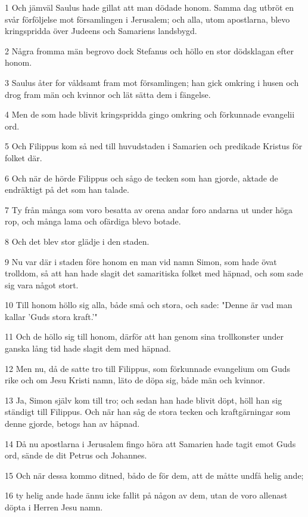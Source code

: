\par 1 Och jämväl Saulus hade gillat att man dödade honom. Samma dag utbröt en svår förföljelse mot församlingen i Jerusalem; och alla, utom apostlarna, blevo kringspridda över Judeens och Samariens landsbygd.
\par 2 Några fromma män begrovo dock Stefanus och höllo en stor dödsklagan efter honom.
\par 3 Saulus åter for våldsamt fram mot församlingen; han gick omkring i husen och drog fram män och kvinnor och lät sätta dem i fängelse.
\par 4 Men de som hade blivit kringspridda gingo omkring och förkunnade evangelii ord.
\par 5 Och Filippus kom så ned till huvudstaden i Samarien och predikade Kristus för folket där.
\par 6 Och när de hörde Filippus och sågo de tecken som han gjorde, aktade de endräktigt på det som han talade.
\par 7 Ty från många som voro besatta av orena andar foro andarna ut under höga rop, och många lama och ofärdiga blevo botade.
\par 8 Och det blev stor glädje i den staden.
\par 9 Nu var där i staden före honom en man vid namn Simon, som hade övat trolldom, så att han hade slagit det samaritiska folket med häpnad, och som sade sig vara något stort.
\par 10 Till honom höllo sig alla, både små och stora, och sade: "Denne är vad man kallar 'Guds stora kraft.'"
\par 11 Och de höllo sig till honom, därför att han genom sina trollkonster under ganska lång tid hade slagit dem med häpnad.
\par 12 Men nu, då de satte tro till Filippus, som förkunnade evangelium om Guds rike och om Jesu Kristi namn, läto de döpa sig, både män och kvinnor.
\par 13 Ja, Simon själv kom till tro; och sedan han hade blivit döpt, höll han sig ständigt till Filippus. Och när han såg de stora tecken och kraftgärningar som denne gjorde, betogs han av häpnad.
\par 14 Då nu apostlarna i Jerusalem fingo höra att Samarien hade tagit emot Guds ord, sände de dit Petrus och Johannes.
\par 15 Och när dessa kommo ditned, bådo de för dem, att de måtte undfå helig ande;
\par 16 ty helig ande hade ännu icke fallit på någon av dem, utan de voro allenast döpta i Herren Jesu namn.
